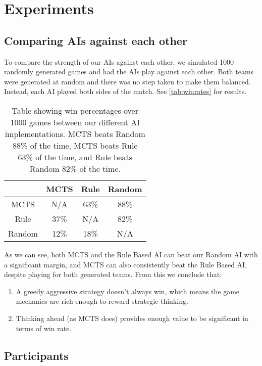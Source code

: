 \chapter{Experiments}
\label{chapter05}

\section{Comparing AIs against each other}

To compare the strength of our AIs against each other, we simulated 1000 randomly generated games
and had the AIs play against each other. Both teams were generated at random and there was no step taken
to make them balanced. Instead, each AI played both sides of the match. See \autoref{tab:winrates} for results.

\begin{table}[h]
	\centering
	\begin{tabular}{|| c | c c c ||}
		\hline
		& MCTS & Rule & Random \\
		\hline\hline
		MCTS & N/A & 63\% & 88\% \\
		Rule & 37\%& N/A & 82\% \\
		Random & 12\% & 18\% & N/A \\
		\hline
	\end{tabular}
	\caption{Table showing win percentages over 1000 games between our different AI implementations.
	MCTS beats Random 88\% of the time, MCTS beats Rule 63\% of the time, and Rule beats Random 82\% of the time.}
	\label{tab:winrates}
\end{table}

As we can see, both MCTS and the Rule Based AI can beat our Random AI with a significant margin,
and MCTS can also consistently beat the Rule Based AI, despite playing for both generated teams.
From this we conclude that:

\begin{enumerate}
	\item A greedy aggressive strategy doesn't always win, which means the game mechanics are rich enough
	to reward strategic thinking.
	\item Thinking ahead (as MCTS does) provides enough value to be significant in terms of win rate.
\end{enumerate}

\section{Participants}

